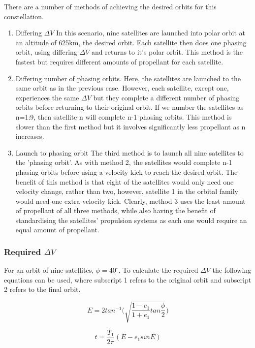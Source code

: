 There are a number of methods of achieving the desired orbits for this constellation.
\begin{enumerate}
	\item Differing $\Delta V$
	In this scenario, nine satellites are launched into polar orbit at an altitude of 625km, the desired orbit. Each satellite then does one phasing orbit, using differing $\Delta V$ and returns to it's polar orbit. This method is the fastest but requires different amounts of propellant for each satellite.
	\item Differing number of phasing orbits.
	Here, the satellites are launched to the same orbit as in the previous case. However, each satellite, except one, experiences the same $\Delta V$ but they complete a different number of phasing orbits before returning to their original orbit. If we number the satellites as n=1:9, then satellite n will complete n-1 phasing orbits. This method is slower than the first method but it involves significantly less propellant as n increases.
	\item Launch to phasing orbit
	The third method is to launch all nine satellites to the 'phasing orbit'. As with method 2, the satellites would complete n-1 phasing orbits before using a velocity kick to reach the desired orbit. The benefit of this method is that eight of the satellites would only need one velocity change, rather than two, however, satellite 1 in the orbital family would need one extra velocity kick. Clearly, method 3 uses the least amount of propellant of all three methods, while also having the benefit of standardising the satellites' propulsion systems as each one would require an equal amount of propellant.
\end{enumerate}

\subsubsection{Required $\Delta V$}
For an orbit of nine satellites, $\phi = 40^{\circ}$. To calculate the required $\Delta V$ the following equations can be used, where subscript 1 refers to the original orbit and subscript 2 refers to the final orbit.

\begin{equation}
	E=2tan^{-1}\bigg(\sqrt{\frac{1-e_1}{1+e_1}tan\frac{\phi}{2}} \bigg)
	\label{MMeq1}
\end{equation}

\begin{equation}
	t=\frac{T_1}{2\pi}(E - e_1 sinE)
	\label{MMeq2}
\end{equation}

